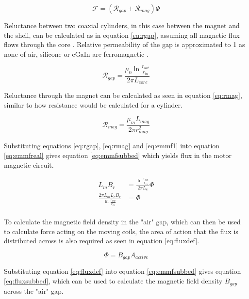 \documentclass[a4paper,12pt]{article}
\begin{document}
\begin{equation}\label{eq:emmfreal}
    \mathcal{F}=(\mathcal{R}_{gap}+\mathcal{R}_{mag})\Phi
\end{equation}

Reluctance between two coaxial cylinders, in this case between the magnet and the shell, can be calculated as in equation \ref{eq:rgap}, assuming all magnetic flux flows through the core \cite{changChapterElectrodynamics2006}. Relative permeability of the gap is approximated to 1 as none of air, silicone or eGaIn are ferromagnetic \cite{engineeringtoolboxPermeability2016}.

\begin{equation}\label{eq:rgap}
    \mathcal{R}_{gap}=\frac{\mu_0 \ln{\frac{r_{out}}{r_{in}}}}{2\pi L_{core}}
\end{equation}

Reluctance through the magnet can be calculated as seen in equation \ref{eq:rmag}, similar to how resistance would be calculated for a cylinder.

\begin{equation}\label{eq:rmag}
    \mathcal{R}_{mag}=\frac{\mu_m L_{mag}}{2\pi r_{mag}^2}
\end{equation}

Substituting equations \ref{eq:rgap}, \ref{eq:rmag} and \ref{eq:emmf1} into equation \ref{eq:emmfreal} gives equation \ref{eq:emmfsubbed} which yields flux in the motor magnetic circuit.

\begin{equation}\label{eq:emmfsubbed}
    \begin{split}
        L_m B_r & = \frac{\ln{\frac{r_{out}}{r_{in}}}}{2\pi L_c}\Phi\\
        \frac{2\pi L_m L_c B_r}{\ln{\frac{r_{out}}{r_{in}}}} & = \Phi\\
    \end{split}
\end{equation}

To calculate the magnetic field density in the "air" gap, which can then be used to calculate force acting on the moving coils, the area of action that the flux is distributed across is also required as seen in equation \ref{eq:fluxdef}.

\begin{equation}\label{eq:fluxdef}
    \Phi = B_{gap}A_{active}
\end{equation}

Substituting equation \ref{eq:fluxdef} into equation \ref{eq:emmfsubbed} gives equation \ref{eq:fluxsubbed}, which can be used to calculate the magnetic field density $B_{gap}$ across the "air" gap.
\end{document}
